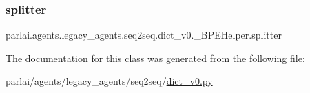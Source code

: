 \subsubsection{\texorpdfstring{splitter}{splitter}}
{\footnotesize\ttfamily parlai.\+agents.\+legacy\+\_\+agents.\+seq2seq.\+dict\+\_\+v0.\+\_\+\+B\+P\+E\+Helper.\+splitter}



The documentation for this class was generated from the following file\+:\begin{DoxyCompactItemize}
\item 
parlai/agents/legacy\+\_\+agents/seq2seq/\hyperlink{dict__v0_8py}{dict\+\_\+v0.\+py}\end{DoxyCompactItemize}
